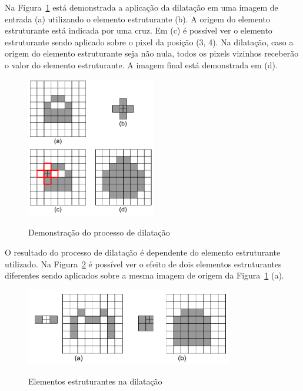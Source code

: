 \documentclass[12pt,oneside,a4paper,english,french,spanish,brazil,]{abntex2}
\begin{document}
Na Figura~\ref{fig:PDI_Dilatacao_1} está demonstrada a aplicação da dilatação em uma imagem de entrada (a) utilizando o elemento estruturante (b). A origem do elemento estruturante está indicada por uma cruz. Em (c) é possível ver o elemento estruturante sendo aplicado sobre o pixel da posição (3, 4). Na dilatação, caso a origem do elemento estruturante seja não nula, todos os pixels vizinhos receberão o valor do elemento estruturante. A imagem final está demonstrada em (d).

\begin{figure}[ht]
\centering
\caption{Demonstração do processo de dilatação}
\includegraphics[width=0.5\textwidth]{imagens/PDI_Dilatacao_1.pdf}
\sourceAuthor
\label{fig:PDI_Dilatacao_1}
\end{figure}

O resultado do processo de dilatação é dependente do elemento estruturante utilizado. Na Figura~\ref{fig:PDI_Dilatacao_2} é possível ver o efeito de dois elementos estruturantes diferentes sendo aplicados sobre a mesma imagem de origem da Figura~\ref{fig:PDI_Dilatacao_1} (a).

\begin{figure}[ht]
\centering
\caption{Elementos estruturantes na dilatação}
\includegraphics[width=0.8\textwidth]{imagens/PDI_Dilatacao_2.pdf}
\sourceAuthor
\label{fig:PDI_Dilatacao_2}
\end{figure}
\end{document}
